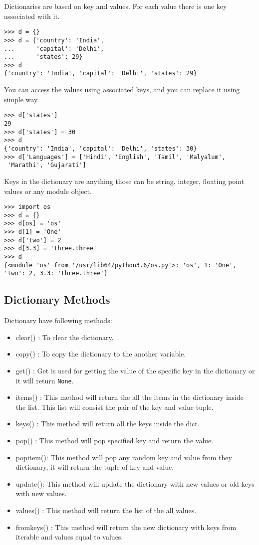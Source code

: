\documentclass[letterpaper,12pt]{book}
\begin{document}
Dictionaries are based on key and values. For each value there is one  key associated with it.
\begin{lstlisting}
>>> d = {}
>>> d = {'country': 'India', 
...      'capital': 'Delhi', 
...      'states': 29}
>>> d
{'country': 'India', 'capital': 'Delhi', 'states': 29}
\end{lstlisting}
You can access the values using associated keys, and you can replace it using simple way.
\begin{lstlisting}
>>> d['states']
29
>>> d['states'] = 30
>>> d
{'country': 'India', 'capital': 'Delhi', 'states': 30}
>>> d['Languages'] = ['Hindi', 'English', 'Tamil', 'Malyalum',
 'Marathi', 'Gujarati']

\end{lstlisting}
Keys in the dictionary are anything those can be string, integer, floating point values or any module object.
\begin{lstlisting}
>>> import os
>>> d = {}
>>> d[os] = 'os'
>>> d[1] = 'One'
>>> d['two'] = 2
>>> d[3.3] = 'three.three'
>>> d
{<module 'os' from '/usr/lib64/python3.6/os.py'>: 'os', 1: 'One', 'two': 2, 3.3: 'three.three'}
\end{lstlisting}
\subsection{Dictionary Methods}
Dictionary have following methods:
\begin{itemize}
	\item clear() : To clear the dictionary.
	\item copy() : To copy the dictionary to the another variable.
	\item get() : Get is used for getting the value of the specific key in the dictionary or it will return \texttt{None}.
	\item items() : This method will return the all the items in the dictionary inside the list. This list will consist the pair of the key and value tuple.
	\item keys() : This method will return all the keys inside the dict.
	\item pop() : This method will pop specified key and return the value.
	\item popitem(): This method will pop any random key and value from they dictionary, it will return the tuple of key and value.
	\item update(): This method will update the dictionary with new values or old keys with new values.
	\item values() : This method will return the list of the all values.
	\item fromkeys() : This method will return the new dictionary with keys from iterable and values equal to values.
\end{itemize}
\end{document}
